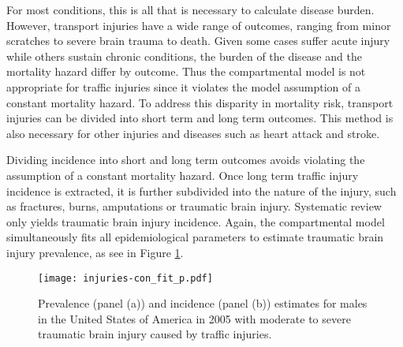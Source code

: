 For most conditions, this is all that is necessary to calculate
disease burden.  However, transport injuries have a wide range of
outcomes, ranging from minor scratches to severe brain trauma to
death.  Given some cases suffer acute injury while others sustain
chronic conditions, the burden of the disease and the mortality hazard
differ by outcome.  Thus the compartmental model is not appropriate
for traffic injuries since it violates the model assumption of a
constant mortality hazard.  To address this disparity in mortality
risk, transport injuries can be divided into short term and long term
outcomes.  This method is also necessary for other injuries and
diseases such as heart attack and stroke.

Dividing incidence into short and long term outcomes avoids violating
the assumption of a constant mortality hazard.  Once long term traffic
injury incidence is extracted, it is further subdivided into the
nature of the injury, such as fractures, burns, amputations or
traumatic brain injury.  Systematic review only yields traumatic brain
injury incidence.  Again, the compartmental model simultaneously fits
all epidemiological parameters to estimate traumatic brain injury
prevalence, as see in Figure \ref{fig:app-injury brain fit}.

    \begin{figure}[h]
        \begin{center}
            \texttt{[image: injuries-con\_fit\_p.pdf]}
            \caption{Prevalence (panel (a)) and incidence (panel (b))
              estimates for males in the United States of America in
              2005 with moderate to severe traumatic brain injury
              caused by traffic injuries.}
            \label{fig:app-injury brain fit}
        \end{center}
    \end{figure}



